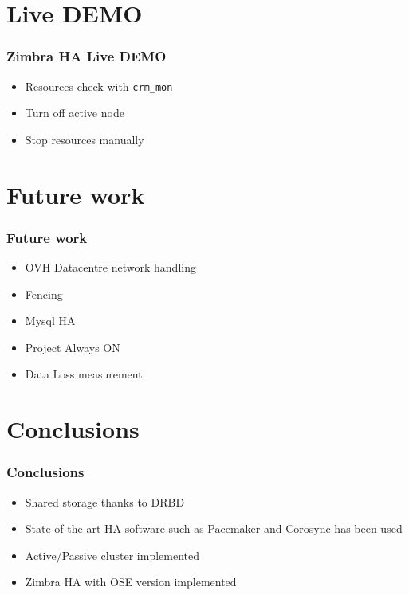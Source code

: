 \documentclass[10pt]{beamer}
\begin{document}
\section {Live DEMO}

\begin{frame}

\frametitle{Zimbra HA Live DEMO}


\begin{center}
  \begin{itemize}
    \item Resources check with {\tt crm\_mon}
    \item Turn off active node
    \item Stop resources manually
  \end{itemize}
\end{center}




\end{frame}
\section {Future work}

\begin{frame}
\frametitle{Future work}

\begin{itemize}
  \item OVH Datacentre network handling
  \item Fencing
  \item Mysql HA
  \item Project Always ON
  \item Data Loss measurement
\end{itemize}
\end{frame}
\section {Conclusions}
\begin{frame}

\frametitle{Conclusions}


\begin{center}
  \begin{itemize}
    \item Shared storage thanks to DRBD
    \item State of the art HA software such as Pacemaker and Corosync has been used
    \item Active/Passive cluster implemented
    \item Zimbra HA with OSE version implemented
  \end{itemize}
\end{center}




\end{frame}
\end{document}

